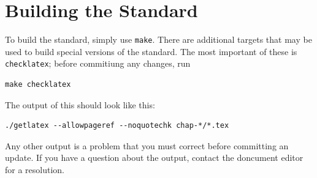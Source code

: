 \documentclass[letterpaper,twoside,11pt,fleqn]{article}
\begin{document}
\section{Building the Standard}
\label{sec:build}
To build the standard, simply use \texttt{make}.
There are additional targets that may be used to build special versions of the
standard.
The most important of these is \texttt{checklatex}; before commitiung
any changes, run
\begin{verbatim}
make checklatex
\end{verbatim}
The output of this should look like this:
\begin{verbatim}
./getlatex --allowpageref --noquotechk chap-*/*.tex
\end{verbatim}
Any other output is a problem that you must correct before committing
an update.
If you have a question about the output, contact the doncument editor
for a resolution.
\end{document}
